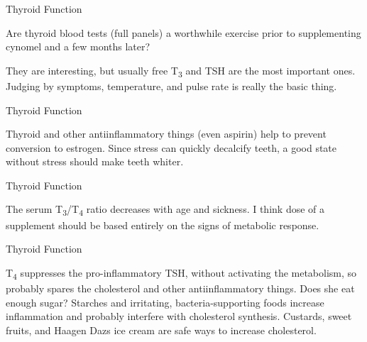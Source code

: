 \documentclass[11pt,oneside,openany,extrafontsizes]{memoir}
\begin{document}
\begin{qaexchange}{Thyroid Function}

    \begin{question}
        Are thyroid blood tests (full panels) a worthwhile exercise prior to supplementing cynomel and a few months later?
    \end{question}

    \begin{answer}
      They are interesting, but usually free T\textsubscript{3} and TSH are the most important ones. Judging by symptoms, temperature, and pulse rate is really the basic thing.
    \end{answer}
\end{qaexchange}

\begin{standalonequote}{Thyroid Function}

    \begin{answer}
      Thyroid and other antiinflammatory things (even aspirin) help to prevent conversion to estrogen. Since stress can quickly decalcify teeth, a good state without stress should make teeth whiter.
    \end{answer}
\end{standalonequote}

\begin{standalonequote}{Thyroid Function}

    \begin{answer}
      The serum T\textsubscript{3}/T\textsubscript{4} ratio decreases with age and sickness. I think dose of a supplement should be based entirely on the signs of metabolic response.
    \end{answer}
\end{standalonequote}

\begin{standalonequote}{Thyroid Function}

    \begin{answer}
      T\textsubscript{4} suppresses the pro-inflammatory TSH, without activating the metabolism, so probably spares the cholesterol and other antiinflammatory things. Does she eat enough sugar? Starches and irritating, bacteria-supporting foods increase inflammation and probably interfere with cholesterol synthesis. Custards, sweet fruits, and Haagen Dazs ice cream are safe ways to increase cholesterol.
    \end{answer}
\end{standalonequote}
\end{document}

